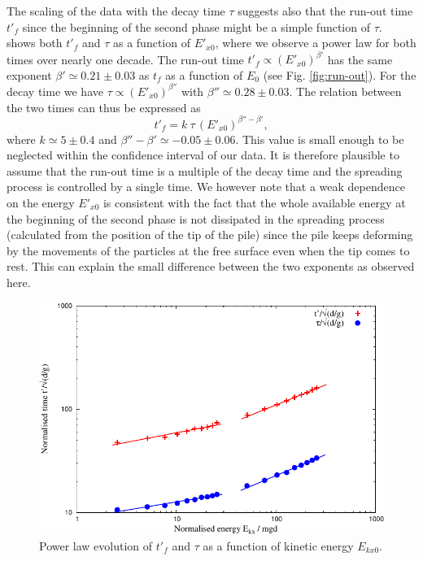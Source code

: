 The scaling of the data with the decay time $\tau$ suggests also that the 
run-out time $t'_f$ since the beginning of the second phase might be a simple 
function of $\tau$.~ shows both $t'_f$ and $\tau$ as 
a function of $E'_{x0}$, where we observe a power law for both times over 
nearly one decade. The run-out time $t'_f \propto (E'_{x0})^{\beta'}$ has the 
same exponent $\beta' \simeq 0.21 \pm 0.03$ as $t_f$ as a function of $E_0$ 
(see Fig. \ref{fig:run-out}). For the decay time we have 
$\tau \propto (E'_{x0})^{\beta''}$ with $\beta'' \simeq 0.28 \pm 0.03$. The 
relation between the two times can thus be expressed as 
\begin{equation}
t'_f = k  \ \tau \, (E'_{x0})^{\beta'' - \beta'}, 
\label{eqn:t'f}
\end{equation}
where $k \simeq 5 \pm 0.4$ and $\beta'' - \beta' \simeq -0.05 \pm 0.06$. This 
value is small enough to be neglected within the confidence interval of our 
data. It is therefore plausible to assume that  the run-out time is a multiple 
of the decay time and the spreading process is controlled by a single time. We 
however note that a weak dependence on the energy $E'_{x0}$  is consistent with 
the fact that the whole available energy at the beginning of the second phase 
is not dissipated in the spreading process (calculated from the position of the 
tip of the pile) since  the pile keeps deforming by the movements of the 
particles at the free surface even when the tip comes to rest. 
This can explain the small difference between the two exponents as observed 
here.


\begin{figure}[tbhp]
\centering
\includegraphics[width=\textwidth]{tp_tau_mgd}
\caption{Power law evolution of $t'_f$ and $\tau$ as a function of kinetic 
energy $E_{kx0}$.}
\label{fig:tp_tau_mgd}
\end{figure}


